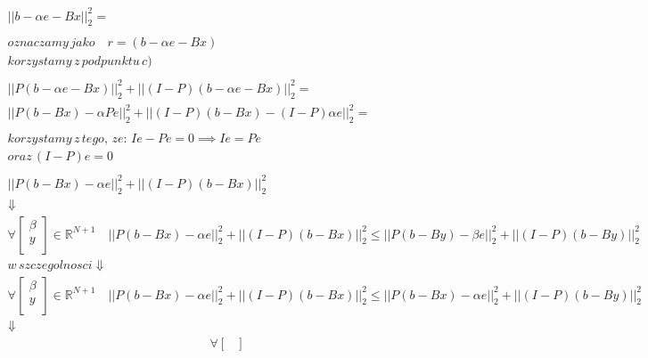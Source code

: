 \documentclass[a4paper]{article}
\renewcommand{\le}{\leqslant} %
\newcommand{\R}{\mathbb R} %
\begin{document}
\begin{enumerate}[label=(\alph*)]
\begin{gather*}
               ||b - \alpha e - B x||_{2}^{2} = \\
               \\
               oznaczamy \, jako \quad r = (b - \alpha e - B x) \\
               korzystamy \, z \, podpunktu \, c) \\
               \\
               ||P (b - \alpha e - B x)||_{2}^{2} + ||(I - P) (b - \alpha e - B x)||_{2}^{2} = \\
               ||P (b - B x) - \alpha P e||_{2}^{2} + ||(I - P)(b - B x) - (I - P) \alpha e||_{2}^{2} = \\
               \\
               korzystamy \, z \, tego, \, ze: \, Ie - Pe = 0 \implies Ie = Pe \\
               oraz \, (I - P) e = 0 \\
               \\
               ||P (b - B x) - \alpha e||_{2}^{2} + ||(I - P)(b - B x)||_{2}^{2} \\
               \Downarrow \\
               \forall
               \begin{bmatrix}
                  \beta \\
                  y \\
               \end{bmatrix}
               \in \R^{N + 1} \quad
               ||P (b - B x) - \alpha e||_{2}^{2} + ||(I - P)(b - B x)||_{2}^{2}
               \le
               ||P (b - B y) - \beta e||_{2}^{2} + ||(I - P)(b - B y)||_{2}^{2} \\
               w \, szczegolnosci \Downarrow \\
               \forall
               \begin{bmatrix}
                  \beta \\
                  y \\
               \end{bmatrix}
               \in \R^{N + 1} \quad
               ||P (b - B x) - \alpha e||_{2}^{2} + ||(I - P)(b - B x)||_{2}^{2}
               \le
               ||P (b - B x) - \alpha e||_{2}^{2} + ||(I - P)(b - B y)||_{2}^{2} \\
               \Downarrow
               \end{gather*}
               \begin{gather*}
               \forall
               \begin{bmatrix}

\end{bmatrix}
\end{gather*}
\end{enumerate}
\end{document}
